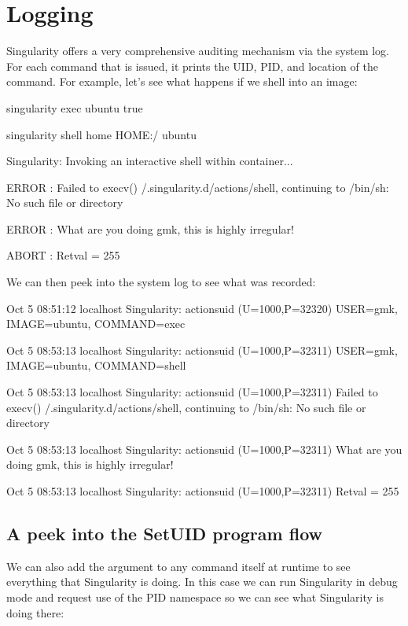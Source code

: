 \documentclass[letterpaper,10pt,english]{sphinxmanual}
\begin{document}
\section{Logging}
\label{\detokenize{security:logging}}
Singularity offers a very comprehensive auditing mechanism via the
system log. For each command that is issued, it prints the UID, PID, and
location of the command. For example, let’s see what happens if we shell
into an image:

%
\begin{sphinxVerbatim}[commandchars=\\\{\}]
\PYGZdl{} singularity exec ubuntu true

\PYGZdl{} singularity shell \PYGZhy{}\PYGZhy{}home \PYGZdl{}HOME:/ ubuntu

Singularity: Invoking an interactive shell within container...


ERROR  : Failed to execv() /.singularity.d/actions/shell, continuing to /bin/sh: No such file or directory

ERROR  : What are you doing gmk, this is highly irregular!

ABORT  : Retval = 255
\end{sphinxVerbatim}

We can then peek into the system log to see what was recorded:

%
\begin{sphinxVerbatim}[commandchars=\\\{\}]
Oct  5 08:51:12 localhost Singularity: action\PYGZhy{}suid (U=1000,P=32320)\PYGZgt{} USER=gmk, IMAGE=\PYGZsq{}ubuntu\PYGZsq{}, COMMAND=\PYGZsq{}exec\PYGZsq{}

Oct  5 08:53:13 localhost Singularity: action\PYGZhy{}suid (U=1000,P=32311)\PYGZgt{} USER=gmk, IMAGE=\PYGZsq{}ubuntu\PYGZsq{}, COMMAND=\PYGZsq{}shell\PYGZsq{}

Oct  5 08:53:13 localhost Singularity: action\PYGZhy{}suid (U=1000,P=32311)\PYGZgt{} Failed to execv() /.singularity.d/actions/shell, continuing to /bin/sh: No such file or directory

Oct  5 08:53:13 localhost Singularity: action\PYGZhy{}suid (U=1000,P=32311)\PYGZgt{} What are you doing gmk, this is highly irregular!

Oct  5 08:53:13 localhost Singularity: action\PYGZhy{}suid (U=1000,P=32311)\PYGZgt{} Retval = 255
\end{sphinxVerbatim}


\subsection{A peek into the SetUID program flow}
\label{\detokenize{security:a-peek-into-the-setuid-program-flow}}
We can also add the  argument to any command itself at runtime to see
everything that Singularity is doing. In this case we can run
Singularity in debug mode and request use of the PID namespace so we can
see what Singularity is doing there:
\end{document}
